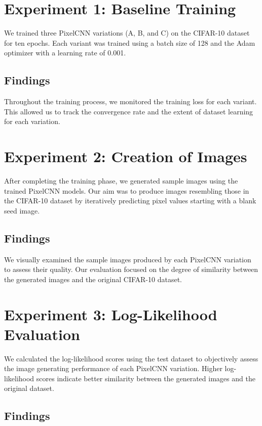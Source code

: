 \documentclass{article}
\begin{document}
\section{Experiment 1: Baseline Training}

We trained three PixelCNN variations (A, B, and C) on the CIFAR-10 dataset for ten epochs. Each variant was trained using a batch size of 128 and the Adam optimizer with a learning rate of 0.001.

\subsection{Findings}

Throughout the training process, we monitored the training loss for each variant. This allowed us to track the convergence rate and the extent of dataset learning for each variation.

\section{Experiment 2: Creation of Images}

After completing the training phase, we generated sample images using the trained PixelCNN models. Our aim was to produce images resembling those in the CIFAR-10 dataset by iteratively predicting pixel values starting with a blank seed image.

\subsection{Findings}

We visually examined the sample images produced by each PixelCNN variation to assess their quality. Our evaluation focused on the degree of similarity between the generated images and the original CIFAR-10 dataset.

\section{Experiment 3: Log-Likelihood Evaluation}

We calculated the log-likelihood scores using the test dataset to objectively assess the image generating performance of each PixelCNN variation. Higher log-likelihood scores indicate better similarity between the generated images and the original dataset.

\subsection{Findings}
\end{document}
